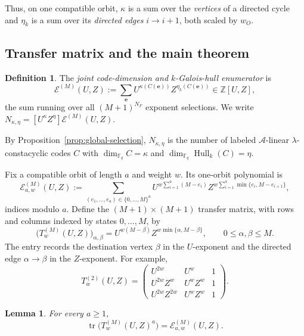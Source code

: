 \documentclass[11pt,a4paper]{article}
\newcommand{\F}{\mathbb F}
\newcommand{\A}{\mathcal A}
\newcommand{\Epoly}{\mathscr E}
\newcommand{\Hull}{\operatorname{Hull}}
\numberwithin{equation}{section}
\theoremstyle{plain}
\newtheorem{lemma}[theorem]{Lemma}
\theoremstyle{definition}
\newtheorem{definition}[theorem]{Definition}
\theoremstyle{remark}
\begin{document}
Thus, on one compatible orbit, $\kappa$ is a sum over the \emph{vertices} of a
directed cycle and $\eta_k$ is a sum over its \emph{directed edges}
$i\to i+1$, both scaled by $w_O$.

\subsection{Transfer matrix and the main theorem}\label{sec:transfer}

\begin{definition}\label{def:enumerator}
The \emph{joint code-dimension and $k$-Galois-hull enumerator} is
\[
\Epoly^{(M)}(U,Z)
   :=\sum_{\mathbf{e}}U^{\kappa(C(\mathbf{e}))}
                      Z^{\eta_k(C(\mathbf{e}))}
   \in\mathbb{Z}[U,Z],
\]
the sum running over all $(M+1)^{N_F}$ exponent selections.  We write
$N_{\kappa,\eta}=[U^\kappa Z^\eta]\Epoly^{(M)}(U,Z)$.
\end{definition}

By Proposition~\ref{prop:global-selection}, $N_{\kappa,\eta}$ is the number of
labeled $\A$-linear $\lambda$-constacyclic codes $C$ with
$\dim_{\F_q}C=\kappa$ and $\dim_{\F_q}\Hull_k(C)=\eta$.

Fix a compatible orbit of length $a$ and weight $w$.  Its one-orbit polynomial
is
\begin{equation}\label{eq:one-orbit-poly}
\Epoly_{a,w}^{(M)}(U,Z)
 :=\sum_{(e_1,\ldots,e_a)\in\{0,\ldots,M\}^a}
   U^{w\sum_{i=1}^{a}(M-e_i)}
   Z^{w\sum_{i=1}^{a}\min\{e_i,M-e_{i+1}\}},
\end{equation}
indices modulo $a$.  Define the $(M+1)\times(M+1)$ transfer matrix, with rows
and columns indexed by states $0,\ldots,M$, by
\begin{equation}\label{eq:transfer}
\boxed{\;
\bigl(T^{(M)}_w(U,Z)\bigr)_{\alpha,\beta}
   =U^{w(M-\beta)}Z^{w\min\{\alpha,M-\beta\}},
\qquad 0\leq\alpha,\beta\leq M.\;}
\end{equation}
The entry records the destination vertex $\beta$ in the $U$-exponent and the
directed edge $\alpha\to\beta$ in the $Z$-exponent.  For example,
\[
T^{(2)}_w(U,Z)=
\begin{pmatrix}
U^{2w} & U^w & 1\\
U^{2w}Z^w & U^wZ^w & 1\\
U^{2w}Z^{2w} & U^wZ^w & 1
\end{pmatrix}.
\]

\begin{lemma}\label{lem:trace}
For every $a\geq1$,
\[
\operatorname{tr}\bigl(T^{(M)}_w(U,Z)^a\bigr)
   =\Epoly_{a,w}^{(M)}(U,Z).
\]
\end{lemma}
\end{document}
